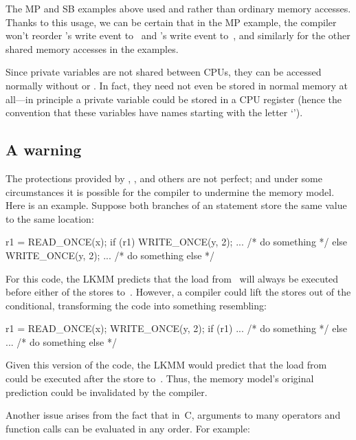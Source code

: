 The MP and SB examples above used  and 
rather than ordinary memory accesses.
Thanks to this usage, we can be certain that in the MP example, the
compiler won't reorder 's write event to~ and 's write
event to~, and similarly for the other shared memory accesses
in the examples.

Since private variables are not shared between CPUs, they can be
accessed normally without  or .
In fact, they need not even be stored in normal memory at
all---in principle a private variable could be stored in a CPU
register (hence the convention that these variables have names
starting with the letter `').


\subsection{A warning}
\label{sec:docs:explanation:A warning}

The protections provided by , , and
others are not perfect; and under some circumstances it is possible
for the compiler to undermine the memory model.
Here is an example.
Suppose both branches of an  statement store the same value
to the same location:

\begin{VerbatimU}
	r1 = READ_ONCE(x);
	if (r1) {
		WRITE_ONCE(y, 2);
		...  /* do something */
	} else {
		WRITE_ONCE(y, 2);
		...  /* do something else */
	}
\end{VerbatimU}

For this code, the LKMM predicts that the load from~ will always be
executed before either of the stores to~.
However, a compiler could lift the stores out of the conditional,
transforming the code into something resembling:

\begin{VerbatimU}
	r1 = READ_ONCE(x);
	WRITE_ONCE(y, 2);
	if (r1) {
		...  /* do something */
	} else {
		...  /* do something else */
	}
\end{VerbatimU}

Given this version of the code, the LKMM would predict that the load
from~ could be executed after the store to~.
Thus, the memory model's original prediction could be invalidated
by the compiler.

Another issue arises from the fact that in~C, arguments to many
operators and function calls can be evaluated in any order.
For example:

